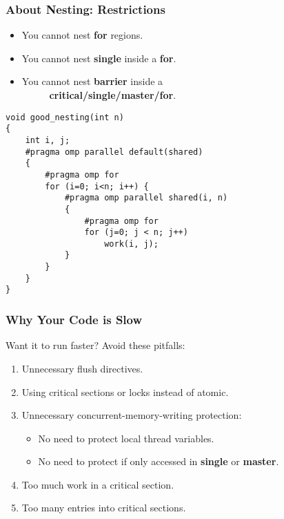 \begin{frame}[fragile]
  \frametitle{About Nesting: Restrictions}

  
  \begin{itemize}
    \item You cannot nest {\bf for} regions.
    \item You cannot nest {\bf single} inside a {\bf for}.
    \item You cannot nest {\bf barrier} inside a\\~~~~~ {\bf critical/single/master/for}.
  \end{itemize}

  \begin{lstlisting}
void good_nesting(int n)
{
    int i, j;
    #pragma omp parallel default(shared)
    {
        #pragma omp for
        for (i=0; i<n; i++) {
            #pragma omp parallel shared(i, n)
            {
                #pragma omp for
                for (j=0; j < n; j++)
                    work(i, j);
            }
        }
    }
}
  \end{lstlisting}
  
\end{frame}

\begin{frame}
  \frametitle{Why Your Code is Slow}

  
  Want it to run faster? Avoid these pitfalls:
  \begin{enumerate}
    \item Unnecessary flush directives.
    \item Using critical sections or locks instead of atomic.
    \item Unnecessary concurrent-memory-writing protection:
      \begin{itemize}
        \item No need to protect local thread variables.
        \item No need to protect if only accessed in {\bf single} or
          {\bf master}.
      \end{itemize}
    \item Too much work in a critical section.
    \item Too many entries into critical sections.
  \end{enumerate}
  
\end{frame}

